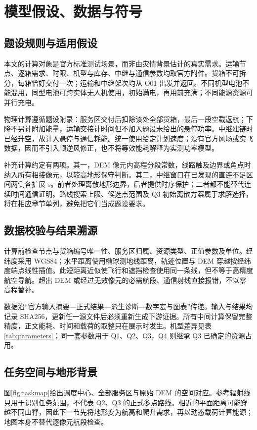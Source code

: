 \section{模型假设、数据与符号}
\subsection{题设规则与适用假设}
本文的计算对象是官方标准测试场景，而非由灾情背景估计的真实需求。运输节点、逐箱需求、时限、机型与库存、中继与通信参数均取官方附件\cite{problem}。货箱不可拆分，每箱恰好交付一次；运输和中继架次均从 O01 出发并返回。不同机型电池不能混用，同型电池可跨实体无人机使用，初始满电，再用前充满；不同能源资源可并行充电。

物理计算遵循题设附录：服务区交付后扣除该处全部货箱，最后一段空载返航；下降不另计附加能量，运输交接计时间但不加入题设未给出的悬停功率。中继建链时已经升空，故计入悬停与通信耗能。统一使用给定计划速度；没有官方风场或实飞数据，因而不引入顺逆风修正，也不将等效能耗解释为实测功率模型。

补充计算约定有两项。其一，DEM 像元内高程分段常数，线路触及边界或角点时纳入所有相接像元，以较高地形保守判断。其二，中继窗口在已发现的直连不足区间两侧各扩展 \RelayGuard{} s。前者处理离散地形边界，后者提供时序保护；二者都不能替代连续时间通信证明。路线搜索上限、候选点范围及 Q3 初始离散方案属于求解选择，将在相应章节单列，避免把它们当成题设要求。

\subsection{数据校验与结果溯源}
计算前检查节点与货箱编号唯一性、服务区归属、资源类型、正值参数及单位。经纬度采用 WGS84；水平距离使用椭球测地线距离\cite{karney}，轨迹位置与 DEM 穿越按经纬度端点线性插值。此短距离近似使飞行和遮挡检查使用同一条线，但不等于高精度航空导航。超出 DEM 或经过无效像元的必需航段、通信射线直接报错，不以零高程替补。

数据沿“官方输入摘要—正式结果—派生诊断—数字宏与图表”传递。输入与结果均记录 SHA256，更新任一源文件后必须重新生成下游证据。所有中间计算保留完整精度，正文能耗、时间和载荷的取整只在展示时发生。机型差异见表\ref{tab:parameters}；同一套参数用于 Q1、Q2、Q3，Q4 则继承 Q3 已确定的资源占用。

\subsection{任务空间与地形背景}
图\ref{fig:taskmap}给出调度中心、全部服务区与原始 DEM 的空间对应。参考辐射线只用于识别任务范围，不代表 Q2、Q3 的正式多点路线。相近的平面距离可能穿越不同山脊，因此下一节先将地形变为航高和爬升需求，再以动态载荷计算能源；地图本身不替代逐像元航段检查。

